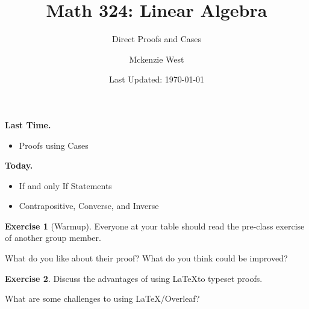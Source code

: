 \documentclass[handout]{beamer}
\newcommand{\fn}{\insertframenumber}
\theoremstyle{definition}
\newtheorem{exercise}{Exercise}
\begin{document}
	\title{Math 324: Linear Algebra}
	\subtitle{Direct Proofs and Cases}
	\author{Mckenzie West}
	\date{Last Updated: \today}
\begin{frame}
\maketitle
\end{frame}

\begin{frame}{\insertframenumber}
	\begin{block}{\textbf{Last Time.}}
	\begin{itemize}[label=--]
		\item Proofs using Cases
	\end{itemize}
	\end{block}
\begin{block}{\textbf{Today.}}
	\begin{itemize}[label=--]
		\item If and only If Statements
		\item Contrapositive, Converse, and Inverse
	\end{itemize}
\end{block}
\end{frame}
\begin{frame}{\fn}
	\begin{exercise}[Warmup]
		Everyone at your table should read the pre-class exercise of another group member.  
		
		What do you like about their proof?  What do you think could be improved?
	\end{exercise}
	
	\begin{exercise}
		Discuss the advantages of using \LaTeX to typeset proofs.
		
		What are some challenges to using \LaTeX/Overleaf?
	\end{exercise}
\end{frame}
\end{document}
